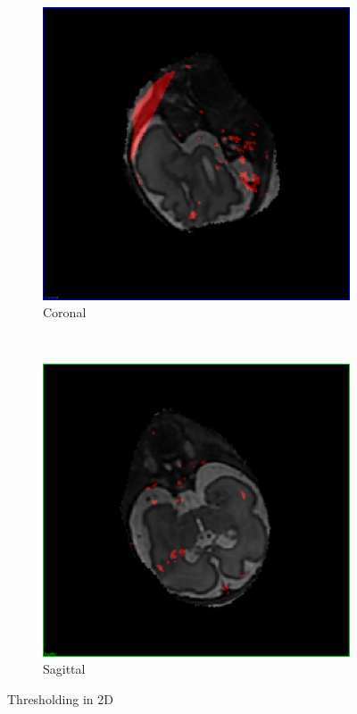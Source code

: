 \begin{figure}[H]
\begin{subfigure}[b]{0.3\textwidth}
    \includegraphics[width=\textwidth]{images/thresholding/thresholding_2d_coronal.png}
    \caption{Coronal}
    \label{fig:thresholding2dcoronal}
  \end{subfigure}%
  ~ %
  \begin{subfigure}[b]{0.3\textwidth}
    \includegraphics[width=\textwidth]{images/thresholding/thresholding_2d_sagittal.png}
    \caption{Sagittal}
    \label{fig:thresholding2dsagittal}  
  \end{subfigure}
  \caption{Thresholding in 2D}\label{fig:thresholding2d}
\end{figure}

